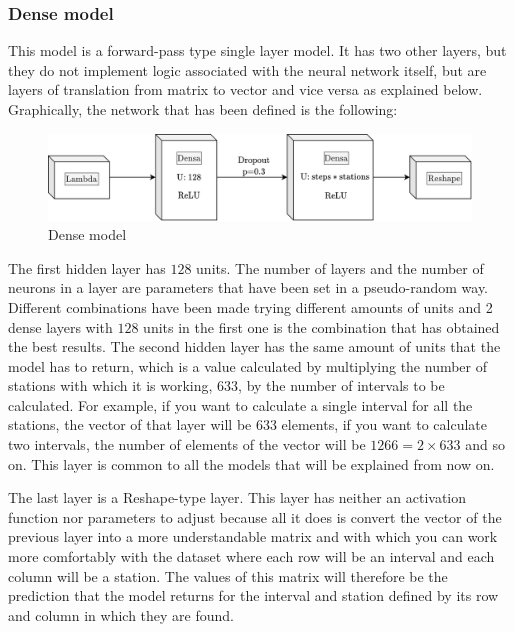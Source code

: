 \subsubsection{Dense model}

This model is a forward-pass type single layer model. It has two other layers, but they do not implement logic associated with the neural network itself, but are layers of translation from matrix to vector and vice versa as explained below. Graphically, the network that has been defined is the following:

\begin{figure}[H]
    \centering
    \includegraphics[width=12cm]{images/solution/models/dense.png}
    \caption{Dense model}
    \label{fig:dense-model}
\end{figure}

The first hidden layer has $128$ units. The number of layers and the number of neurons in a layer are parameters that have been set in a pseudo-random way. Different combinations have been made trying different amounts of units and 2 dense layers with $128$ units in the first one is the combination that has obtained the best results. The second hidden layer has the same amount of units that the model has to return, which is a value calculated by multiplying the number of stations with which it is working, $633$, by the number of intervals to be calculated. For example, if you want to calculate a single interval for all the stations, the vector of that layer will be $633$ elements, if you want to calculate two intervals, the number of elements of the vector will be $1266 = 2 \times 633$ and so on. This layer is common to all the models that will be explained from now on.
\newline

The last layer is a Reshape-type layer. This layer has neither an activation function nor parameters to adjust because all it does is convert the vector of the previous layer into a more understandable matrix and with which you can work more comfortably with the dataset where each row will be an interval and each column will be a station. The values of this matrix will therefore be the prediction that the model returns for the interval and station defined by its row and column in which they are found.
\newline



